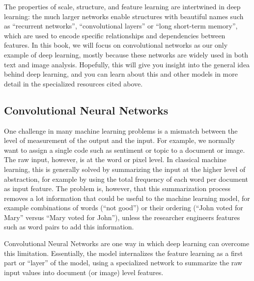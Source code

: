 The properties of scale, structure, and feature learning are intertwined in deep learning: the much larger networks enable structures with beautiful names such as ``recurrent networks'', ``convolutional layers'' or ``long short-term memory'',
which are used to encode specific relationships and dependencies between features.
In this book, we will focus on convolutional networks as our only example of deep learning,
mostly because these networks are widely used in both text and image analysis.
Hopefully, this will give you insight into the general idea behind deep learning,
and you can learn about this and other models in more detail in the specialized resources cited above.

\subsection{Convolutional Neural Networks} \label{sec:cnnbasis}

One challenge in many machine learning problems is a mismatch between the level of measurement of the output and the input.
For example, we normally want to  assign a single code such as sentiment or topic to a document or image.
The raw input, however, is at the word or pixel level.
In classical machine learning, this is generally solved by summarizing the input at the higher level of abstraction,
for example by using the total frequency of each word per document as input feature.
The problem is, however, that this summarization process removes a lot information that could be useful to the machine learning model,
for example combinations of words (``not good'') or their ordering (``John voted for Mary'' versus ``Mary voted for John''),
unless the researcher engineers features such as word pairs to add this information.

Convolutional Neural Networks are one way in which deep learning can overcome this limitation.
Essentially, the model internalizes the feature learning as a first part or ``layer'' of the model,
using a specialized network to summarize the raw input values into document (or image) level features.



